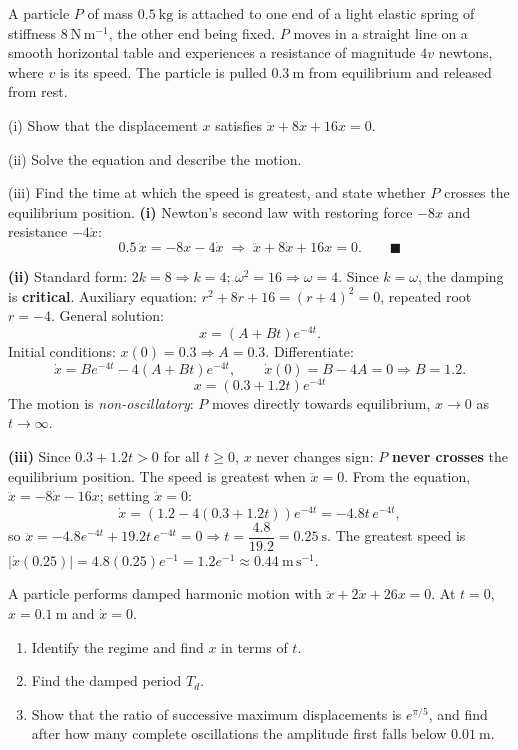 \documentclass[11pt]{article}
\begin{document}
\begin{exoresolu}
A particle $P$ of mass $0.5\ \mathrm{kg}$ is attached to one end of a light elastic spring of stiffness $8\ \mathrm{N\,m^{-1}}$, the other end being fixed. $P$ moves in a straight line on a smooth horizontal table and experiences a resistance of magnitude $4v$ newtons, where $v$ is its speed. The particle is pulled $0.3\ \mathrm{m}$ from equilibrium and released from rest.
\smallskip

(i) Show that the displacement $x$ satisfies $\ddot{x} + 8\dot{x} + 16x = 0$.

(ii) Solve the equation and describe the motion.

(iii) Find the time at which the speed is greatest, and state whether $P$ crosses the equilibrium position.
\tcblower
\textbf{(i)} Newton's second law with restoring force $-8x$ and resistance $-4\dot{x}$:
\[
0.5\,\ddot{x} = -8x - 4\dot{x}
\;\Longrightarrow\;
\ddot{x} + 8\dot{x} + 16x = 0. \qquad\blacksquare
\]

\textbf{(ii)} Standard form: $2k = 8 \Rightarrow k = 4$; $\omega^{2} = 16 \Rightarrow \omega = 4$. Since $k = \omega$, the damping is \textbf{critical}. Auxiliary equation: $r^{2} + 8r + 16 = (r+4)^{2} = 0$, repeated root $r = -4$. General solution:
\[
x = (A + Bt)e^{-4t}.
\]
Initial conditions: $x(0) = 0.3 \Rightarrow A = 0.3$. Differentiate:
\[
\dot{x} = Be^{-4t} - 4(A+Bt)e^{-4t}, \qquad \dot{x}(0) = B - 4A = 0 \Rightarrow B = 1.2.
\]
\[
\boxed{\;x = (0.3 + 1.2t)e^{-4t}\;}
\]
The motion is \emph{non-oscillatory}: $P$ moves directly towards equilibrium, $x \to 0$ as $t \to \infty$.

\textbf{(iii)} Since $0.3 + 1.2t > 0$ for all $t \ge 0$, $x$ never changes sign: $P$ \textbf{never crosses} the equilibrium position. The speed is greatest when $\ddot{x} = 0$. From the equation, $\ddot{x} = -8\dot{x} - 16x$; setting $\ddot{x} = 0$:
\[
\dot{x} = (1.2 - 4(0.3+1.2t))e^{-4t} = -4.8t\,e^{-4t},
\]
so $\ddot{x} = -4.8e^{-4t} + 19.2t\,e^{-4t} = 0 \Rightarrow t = \dfrac{4.8}{19.2} = 0.25\ \mathrm{s}$.
The greatest speed is $|\dot{x}(0.25)| = 4.8(0.25)e^{-1} = 1.2e^{-1} \approx 0.44\ \mathrm{m\,s^{-1}}$.
\end{exoresolu}

\begin{exercice}
A particle performs damped harmonic motion with $\ddot{x} + 2\dot{x} + 26x = 0$. At $t = 0$, $x = 0.1\ \mathrm{m}$ and $\dot{x} = 0$.
\begin{enumerate}
\item Identify the regime and find $x$ in terms of $t$.
\item Find the damped period $T_{d}$.
\item Show that the ratio of successive maximum displacements is $e^{\pi/5}$, and find after how many complete oscillations the amplitude first falls below $0.01\ \mathrm{m}$.
\end{enumerate}
\end{exercice}
\end{document}

